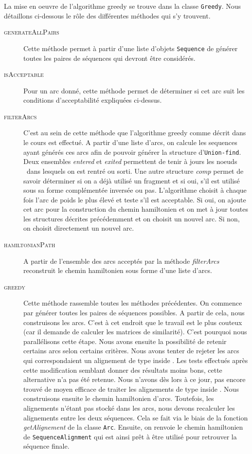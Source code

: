 La mise en oeuvre de l'algorithme greedy se trouve dans la classe \verb|Greedy|. Nous détaillons ci-dessous le rôle des différentes méthodes qui s'y trouvent.

\begin{description}
	\item[\textsc{generateAllPairs}] Cette méthode permet à partir d'une liste d'objets \verb|Sequence| de générer toutes les paires de séquences qui devront être considérés.
	\item[\textsc{isAcceptable}] Pour un arc donné, cette méthode permet de déterminer si cet arc suit les conditions d'acceptabilité expliquées ci-dessus. 
	\item[\textsc{filterArcs}] C'est au sein de cette méthode que l'algorithme greedy comme décrit dans le cours est effectué. A partir d'une liste d'arcs, on calcule les sequences ayant générés ces arcs afin de pouvoir générer la structure d'\verb|Union-find|. Deux ensembles \emph{entered} et \emph{exited} permettent de tenir à jours les \og noeuds \fg~dans lesquels on est rentré ou sorti. Une autre structure \emph{comp} permet de savoir déterminer si on a déjà utilisé un fragment et si oui, s'il est utilisé sous sa forme complémentée inversée ou pas. L'algorithme choisit à chaque fois l'arc de poids le plus élevé et teste s'il est acceptable. Si oui, on ajoute cet arc pour la construction du chemin hamiltonien et on met à jour toutes les structures décrites précédemment et on choisit un nouvel arc. Si non, on choisit directement un nouvel arc.
	\item[\textsc{hamiltonianPath}] A partir de l'ensemble des arcs acceptés par la méthode \emph{filterArcs} reconstruit le chemin hamiltonien sous forme d'une liste d'arcs.
	\item[\textsc{greedy}] Cette méthode rassemble toutes les méthodes précédentes. On commence par générer toutes les paires de séquences possibles. A partir de cela, nous construisons les arcs. C'est à cet endroit que le travail est le plus couteux (car il demande de calculer les matrices de similarité). C'est pourquoi nous parallélisons cette étape. Nous avons ensuite la possibilité de retenir certains arcs selon certains critères. Nous avons tenter de rejeter les arcs qui correspondaient un alignement de type \og inside \fg. Les tests effectués après cette modification semblant donner des résultats moins bons, cette alternative n'a pas été retenue. Nous n'avons dès lors à ce jour, pas encore trouvé de moyen efficace de traiter les alignements de type \og inside \fg. Nous construisons ensuite le chemin hamiltonien d'arcs. Toutefois, les alignements n'étant pas stocké dans les arcs, nous devons recalculer les alignements entre les deux séquences. Cela se fait via le biais de la fonction \emph{getAlignement} de la classe \verb|Arc|. 
	Ensuite, on renvoie le chemin hamiltonien de \verb|SequenceAlignment| qui est ainsi prêt à être utilisé pour retrouver la séquence finale.	
	\end{description}
	


